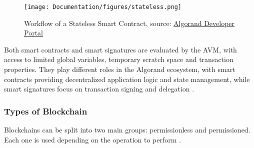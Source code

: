 \begin{figure}[htbp]
	\centering
	\texttt{[image: Documentation/figures/stateless.png]}  %
	\caption{Workflow of a Stateless Smart Contract, source: \href{https://developer.algorand.org/articles/linking-algorand-stateful-and-stateless-smart-contracts/}{Algorand Developer Portal}}
	\label{fig:stateless}
\end{figure}

Both smart contracts and smart signatures are evaluated by the AVM, with access to limited global variables, temporary scratch space and transaction properties. They play different roles in the Algorand ecosystem, with smart contracts providing decentralized application logic and state management, while smart signatures focus on transaction signing and delegation \cite{scalgo, scalgo2}.

\subsubsection{Types of Blockchain}\label{typesofb}

Blockchains can be split into two main groups: permissionless and permissioned. Each one is used depending on the operation to perform \cite{perm_bc}.

